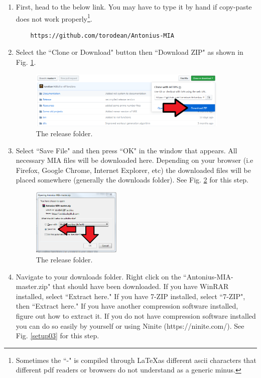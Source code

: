 \begin{enumerate}
	\item First, head to the below link. You may have to type it by hand if copy-paste does not work properly\footnote{Sometimes the ``-" is compiled through \LaTeX as different ascii characters that different pdf readers or browsers do not understand as a generic minus.}.

	\begin{lstlisting}
	https://github.com/torodean/Antonius-MIA
	\end{lstlisting}
	
	\item Select the ``Clone or Download" button then ``Download ZIP" as shown in Fig. \ref{setup01}.
	
	\begin{figure}[h]
		\centering
		\includegraphics[width=0.9\textwidth]{images/setup01.png}
		\caption{The release folder.} \label{setup01}
	\end{figure}
	
	\item Select ``Save File" and then press ``OK" in the window that appears. All necessary MIA files will be downloaded here. Depending on your browser (i.e Firefox, Google Chrome, Internet Explorer, etc) the downloaded files will be placed somewhere (generally the downloads folder). See Fig. \ref{setup02} for this step.
	
	\begin{figure}[h]
		\centering
		\includegraphics[width=0.4\textwidth]{images/setup02.png}
		\caption{The release folder.} \label{setup02}
	\end{figure}
	
	\item Navigate to your downloads folder. Right click on the ``Antonius-MIA-master.zip" that should have been downloaded. If you have WinRAR installed, select ``Extract here." If you have 7-ZIP installed, select ``7-ZIP", then ``Extract here." If you have another compression software installed, figure out how to extract it. If you do not have compression software installed you can do so easily by yourself or using Ninite (https://ninite.com/). See Fig. \ref{setup03} for this step.
	

\end{enumerate}
